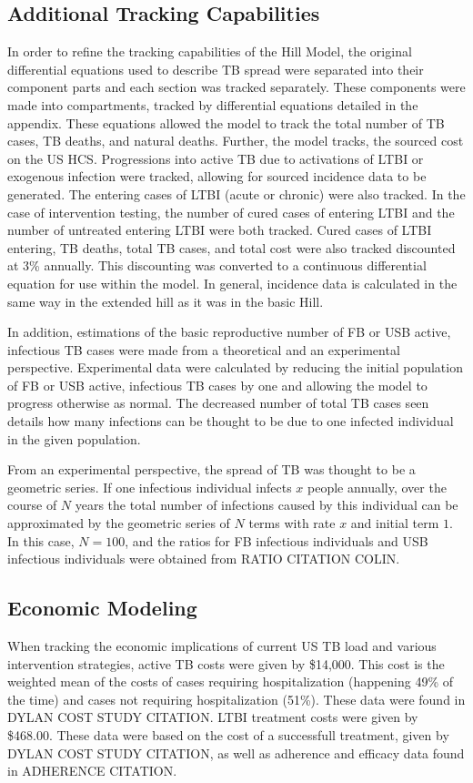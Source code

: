 \documentclass{amsart}
\begin{document}
\subsection{Additional Tracking Capabilities}
In order to refine the tracking capabilities of the
Hill Model, the original differential equations used to describe TB spread were
separated into their component parts and each section was tracked separately.
These components were made into compartments, tracked by differential equations
detailed in the appendix. These equations allowed the model to track the total
number of TB cases, TB deaths, and  natural deaths. Further, the model tracks,
the sourced cost on the US HCS. Progressions into
active TB due to activations of LTBI or exogenous infection were tracked,
allowing for sourced incidence data to be generated. The entering cases of LTBI
(acute or chronic) were also tracked. In the case of intervention testing, the
number of cured cases of entering LTBI and the number of untreated entering LTBI
were both tracked. Cured cases of LTBI entering, TB deaths, total TB cases, and
total cost were also tracked discounted at 3\% annually. This discounting was
converted to a continuous differential equation for use within the model. In
general, incidence data is calculated in the same way in the extended hill as it
was in the basic Hill.

In addition, estimations of the basic reproductive number of FB or USB active,
infectious TB cases were made from a theoretical and an experimental
perspective. Experimental data were calculated by reducing the initial
population of FB or USB active, infectious TB cases by one and allowing the
model to progress otherwise as normal. The decreased number of total TB cases
seen details how many infections can be thought to be due to one infected
individual in the given population.

From an experimental perspective, the spread of TB was thought to be a geometric
series. If one infectious individual infects $x$ people annually, over the
course of $N$ years the total number of infections caused by this individual can
be approximated by the geometric series of $N$ terms with rate $x$ and initial
term $1$. In this case, $N = 100$, and the ratios for FB infectious individuals
and USB infectious individuals were obtained from RATIO CITATION COLIN. 
\subsection{Economic Modeling}
When tracking the economic implications of current US TB load and various
intervention strategies, active TB costs were given by \$14,000. This cost is
the weighted mean of the costs of cases requiring hospitalization (happening
49\% of the time) and cases not requiring hospitalization (51\%). These data
were found in DYLAN COST STUDY CITATION. LTBI treatment costs were given by
\$468.00. These data were based on the cost of a successfull treatment, given by
DYLAN COST STUDY CITATION, as well as adherence and efficacy data found in
ADHERENCE CITATION.
\end{document}

